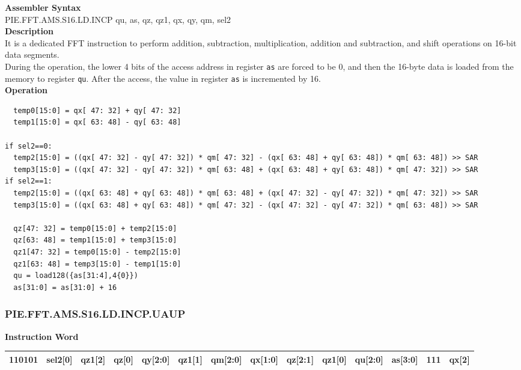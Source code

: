 \textbf{Assembler Syntax} \\
PIE.FFT.AMS.S16.LD.INCP qu, as, qz, qz1, qx, qy, qm, sel2 \\
\textbf{Description} \\
It is a dedicated FFT instruction to perform addition, subtraction, multiplication, addition and subtraction, and shift operations on 16-bit data segments.\\
During the operation, the lower 4 bits of the access address in register \lstinline{as} are forced to be 0, and then the 16-byte data is loaded from the memory to register \lstinline{qu}. After the access, the value in register \lstinline{as} is incremented by 16.\\
\textbf{Operation}
\begin{lstlisting}
  temp0[15:0] = qx[ 47: 32] + qy[ 47: 32]
  temp1[15:0] = qx[ 63: 48] - qy[ 63: 48]

if sel2==0:
  temp2[15:0] = ((qx[ 47: 32] - qy[ 47: 32]) * qm[ 47: 32] - (qx[ 63: 48] + qy[ 63: 48]) * qm[ 63: 48]) >> SAR
  temp3[15:0] = ((qx[ 47: 32] - qy[ 47: 32]) * qm[ 63: 48] + (qx[ 63: 48] + qy[ 63: 48]) * qm[ 47: 32]) >> SAR
if sel2==1:
  temp2[15:0] = ((qx[ 63: 48] + qy[ 63: 48]) * qm[ 63: 48] + (qx[ 47: 32] - qy[ 47: 32]) * qm[ 47: 32]) >> SAR
  temp3[15:0] = ((qx[ 63: 48] + qy[ 63: 48]) * qm[ 47: 32] - (qx[ 47: 32] - qy[ 47: 32]) * qm[ 63: 48]) >> SAR

  qz[47: 32] = temp0[15:0] + temp2[15:0]
  qz[63: 48] = temp1[15:0] + temp3[15:0]
  qz1[47: 32] = temp0[15:0] - temp2[15:0]
  qz1[63: 48] = temp3[15:0] - temp1[15:0]
  qu = load128({as[31:4],4{0}})
  as[31:0] = as[31:0] + 16
\end{lstlisting}

\newpage
\subsubsection{PIE.FFT.AMS.S16.LD.INCP.UAUP}\label{instruction:PIEFFTAMSS16LDINCPUAUP}
\setlength\tabcolsep{5pt}
\textbf{Instruction Word} \\
\begin{tabular}{|c|c|c|c|c|c|c|c|c|c|c|c|c|c|}
	\hline
	110101 & sel2[0] & qz1[2] & qz[0] & qy[2:0] & qz1[1] & qm[2:0] & qx[1:0] & qz[2:1] & qz1[0] & qu[2:0] & as[3:0] & 111 & qx[2] \\
	\hline
\end{tabular}

